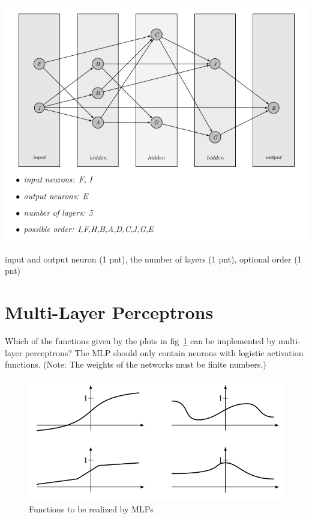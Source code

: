 \documentclass[12pt]{article}
\begin{document}
\begin{center}
	\includegraphics[width=.9\textwidth]{fig/2018-04-02-14-57-10.png}
\end{center}

input and output neuron (1 pnt), the number of layers (1 pnt), optional order (1 pnt)

\newpage
\section{Multi-Layer Perceptrons}

Which of the functions given by the plots in fig~\ref{fig:mlp3} can be implemented by multi-layer
perceptrons? The MLP should only contain neurons with logistic activation functions.
(Note: The weights of the networks must be finite numbers.)

\begin{figure}
	\centering
	\includegraphics[width=.75\textwidth]{fig/2018-03-19-13-57-32.png}
	\caption{Functions to be realized by MLPs} \label{fig:mlp3}
\end{figure}
\end{document}
